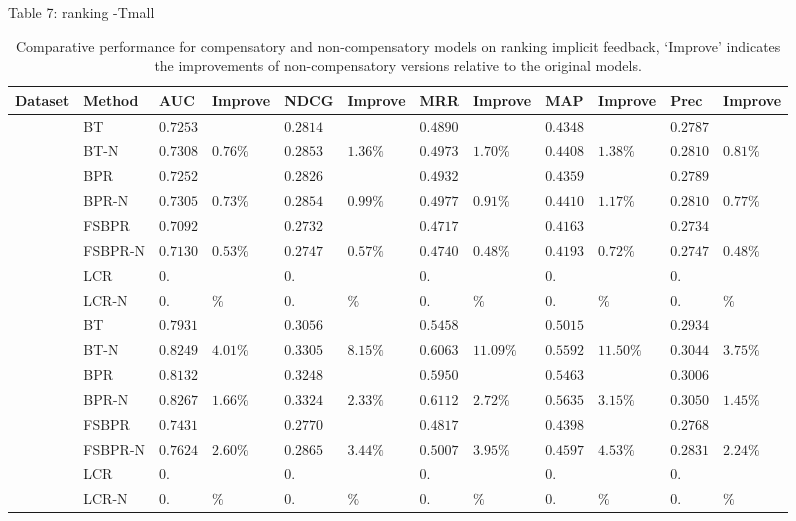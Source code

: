 \documentclass[letterpaper]{article} %
\begin{document}
Table 7: ranking -Tmall
\begin{table}[htp]
\tiny
\caption{Comparative performance for compensatory and non-compensatory models on ranking implicit feedback, `Improve' indicates the improvements of non-compensatory versions relative to the original models.}
\begin{center}
\begin{tabular}{p{0.4cm}<{\centering}|p{1.2cm}<{\centering} |p{0.5cm} p{0.6cm} |p{0.5cm} p{0.6cm} |p{0.5cm} p{0.6cm}|p{0.5cm} p{0.6cm} |p{0.5cm} p{0.6cm}}
\hline
Dataset	& Method	& AUC	& Improve&	NDCG&	Improve&	MRR	&Improve &	MAP&	Improve&	Prec	&Improve\\\hline
{} &	BT	& $0.7253 $&  &$0.2814$& &$0.4890$&   &$0.4348$& 	& $0.2787$ 	&\\
	&BT-N	&$0.7308$ &	$0.76\%$	&$0.2853 $	&$1.36\%$	&$0.4973$ &	$1.70\%$	&$0.4408$ &	$1.38\%$	&$0.2810 $	&$0.81\%$\\
	&BPR&	$0.7252$ 	&&	$0.2826$ 	&&	$0.4932$ & &$0.4359$& 	& $0.2789$ 	&\\
	&BPR-N	&$0.7305$ 	&$0.73\%$	&$0.2854$ &	$0.99\%$	&$0.4977$ 	&$0.91\%$ &$0.4410$ &	$1.17\%$	&$0.2810 $	&$0.77\%$	\\
	&FSBPR		&$0.7092$&	&$0.2732$ 	&&	$0.4717$& &$0.4163$& 	& $0.2734$ 	&\\	
	&FSBPR-N	&$0.7130$	&$0.53\%$	&	$0.2747$ 	&$0.57\%$	&$0.4740$ 	&$0.48\%$ &$0.4193$ &	$0.72\%$	&$0.2747 $	&$0.48\%$	\\
	&LCR		&$0.$&	&$0.$ 	&&	$0.$& &$0.$& 	& $0.$ 	&\\	
	&LCR-N	&$0.$	&$\%$	&	$0.$ 	&$\%$	&$0.$ 	&$\%$ &$0.$ &	$\%$	&$0. $	&$\%$\\

	\hline
{}	&	BT	& $0.7931 $&  &$0.3056$& &$0.5458$&   &$0.5015$& 	& $0.2934$ 	&\\
	&BT-N	&$0.8249$ &	$4.01\%$	&$0.3305 $	&$8.15\%$	&$0.6063$ &	$11.09\%$	&$0.5592$ &	$11.50\%$	&$0.3044 $	&$3.75\%$\\
	&BPR&	$0.8132$ 	&&	$0.3248$ 	&&	$0.5950$ & &$0.5463$& 	& $0.3006$ 	&\\
	&BPR-N	&$0.8267$ 	&$1.66\%$	&$0.3324$ &	$2.33\%$	&$0.6112$ 	&$2.72\%$ &$0.5635$ &	$3.15\%$	&$0.3050 $	&$1.45\%$	\\
	&FSBPR		&$0.7431$&	&$0.2770$ 	&&	$0.4817$& &$0.4398$& 	& $0.2768$ 	&\\	
	&FSBPR-N	&$0.7624$	&$2.60\%$	&	$0.2865$ 	&$3.44\%$	&$0.5007$ 	&$3.95\%$ &$0.4597$ &	$4.53\%$	&$0.2831 $	&$2.24\%$	\\
	&LCR		&$0.$&	&$0.$ 	&&	$0.$& &$0.$& 	& $0.$ 	&\\	
	&LCR-N	&$0.$	&$\%$	&	$0.$ 	&$\%$	&$0.$ 	&$\%$ &$0.$ &	$\%$	&$0. $	&$\%$\\


\end{tabular}
\end{center}
\end{table}
\end{document}
